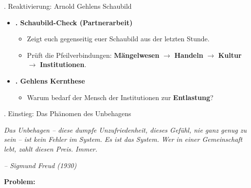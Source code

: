 \documentclass{beamer}
\begin{document}
\begin{frame}[t]{\faHistory {}. Reaktivierung: Arnold Gehlens Schaubild}
\vspace{0.3cm}

\begin{itemize}
    \item [] \Large \textbf{\faComments {}. Schaubild-Check (Partnerarbeit)}
    \vspace{0.2cm}
    \begin{itemize}
        \item \normalsize Zeigt euch gegenseitig euer Schaubild aus der letzten Stunde.
        \item \normalsize Prüft die Pfeilverbindungen: \textbf{Mängelwesen} $\rightarrow$ \textbf{Handeln} $\rightarrow$ \textbf{Kultur} $\rightarrow$ \textbf{Institutionen}.
    \end{itemize}
    
    \vspace{0.7cm}
    
    \item [] \Large \textbf{\faCompass {}. Gehlens Kernthese}
    \vspace{0.2cm}
    \begin{itemize}
        \item \normalsize Warum bedarf der Mensch der Institutionen zur \textbf{Entlastung}?
    \end{itemize}
\end{itemize}
\end{frame}

\begin{frame}[t]{\faQuoteLeft {}. Einstieg: Das Phänomen des Unbehagens}
\vspace{0.1cm}

\small
\glqq\textit{Das Unbehagen -- diese dumpfe Unzufriedenheit, dieses Gefühl, nie ganz genug zu sein -- ist kein Fehler im System. Es ist das System. Wer in einer Gemeinschaft lebt, zahlt diesen Preis. Immer.}\grqq
\par\vspace{2pt}
\hfill{\footnotesize \textit{-- Sigmund Freud (1930)}}

\vspace{0.3cm}

\Large \textbf{\faExclamationTriangle \enskip Problem:}

\vfill

\end{frame}
\end{document}

